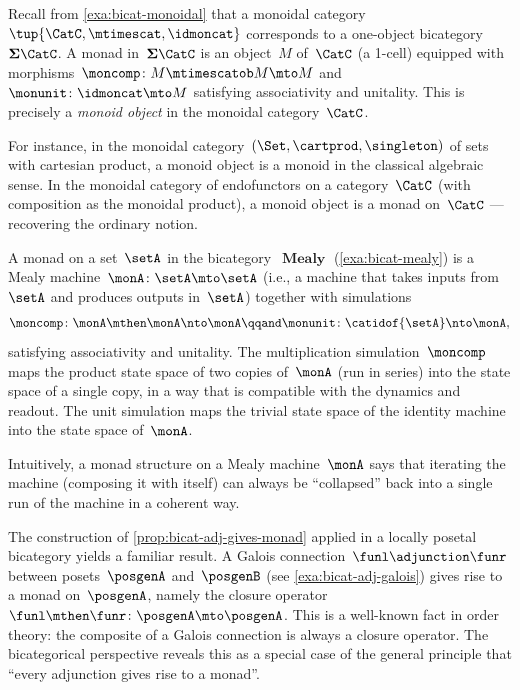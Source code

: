\begin{example}
    \label{exa:bicat-monad-monoidal}
    Recall from \cref{exa:bicat-monoidal} that a monoidal category~$\tup{\CatC, \mtimescat, \idmoncat}$ corresponds to a one-object bicategory~$\mathbf{\Sigma}\CatC$.
    A monad in~$\mathbf{\Sigma}\CatC$ is an object~$M$ of~$\CatC$ (a 1-cell) equipped with morphisms~$\moncomp \colon M \mtimescatob M \mto M$ and~$\monunit \colon \idmoncat \mto M$ satisfying associativity and unitality.
    This is precisely a \emph{monoid object} in the monoidal category~$\CatC$.

    For instance, in the monoidal category~$(\Set, \cartprod, \singleton)$ of sets with cartesian product, a monoid object is a monoid in the classical algebraic sense.
    In the monoidal category of endofunctors on a category~$\CatC$ (with composition as the monoidal product), a monoid object is a monad on~$\CatC$ --- recovering the ordinary notion.
\end{example}

\begin{example}
    \label{exa:bicat-monad-mealy}
    A monad on a set~$\setA$ in the bicategory~$\operatorname{\textbf{Mealy}}$ (\cref{exa:bicat-mealy}) is a Mealy machine~$\monA \colon \setA \mto \setA$ (i.e., a machine that takes inputs from~$\setA$ and produces outputs in~$\setA$) together with simulations
    \begin{equation}
        \moncomp \colon \monA \mthen \monA \nto \monA \qqand \monunit \colon \catidof{\setA} \nto \monA,
    \end{equation}
    satisfying associativity and unitality.
    The multiplication simulation~$\moncomp$ maps the product state space of two copies of~$\monA$ (run in series) into the state space of a single copy, in a way that is compatible with the dynamics and readout.
    The unit simulation maps the trivial state space of the identity machine into the state space of~$\monA$.

    Intuitively, a monad structure on a Mealy machine~$\monA$ says that iterating the machine (composing it with itself) can always be ``collapsed'' back into a single run of the machine in a coherent way.
\end{example}

\begin{example}
    \label{exa:bicat-monad-from-galois}
    The construction of \cref{prop:bicat-adj-gives-monad} applied in a locally posetal bicategory yields a familiar result.
    A Galois connection~$\funl \adjunction \funr$ between posets~$\posgenA$ and~$\posgenB$ (see \cref{exa:bicat-adj-galois}) gives rise to a monad on~$\posgenA$, namely the closure operator~$\funl \mthen \funr \colon \posgenA \mto \posgenA$.
    This is a well-known fact in order theory: the composite of a Galois connection is always a closure operator.
    The bicategorical perspective reveals this as a special case of the general principle that ``every adjunction gives rise to a monad''.
\end{example}

